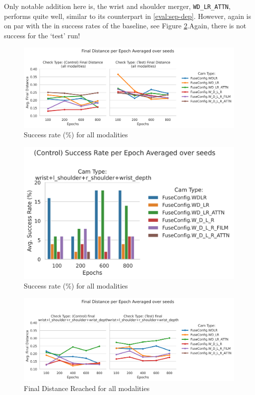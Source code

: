 Only notable addition here is, the wrist and shoulder merger, \verb|WD_LR_ATTN|, performs quite well, similar to its counterpart in \ref{eval:sep-dep}. However, again is on par with the in success rates of the baseline, see Figure \ref{fig:derivatives-all-cams-success}.Again, there is not success for the `test' run!



\begin{figure}[H]
  \centering
  \includegraphics[width=0.7\linewidth]{assets/evaluation/derivatives/grasp-normal-allcams.png}
  \caption{Success rate (\%) for all modalities}\label{fig:deriv-normal-final-allcams}
\end{figure}

\begin{figure}[H]
  \centering
  \includegraphics[width=0.4\linewidth]{assets/evaluation/derivatives/grasp-normal-control-success-cams.png}
  \caption{Success rate (\%) for all modalities}\label{fig:derivatives-all-cams-success}
\end{figure}


\begin{figure}[H]
  \centering
  \includegraphics[width=0.7\linewidth]{assets/evaluation/derivatives/grasp-smaller-final-cams.png}
  \caption{Final Distance Reached for all modalities}\label{fig:deriv-smaller-final-allcams}
\end{figure}

